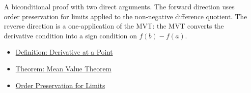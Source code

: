 \begin{remark*}
A biconditional proof with two direct arguments. The forward direction uses order preservation for limits applied to the non-negative difference quotient. The reverse direction is a one-application of the MVT: the MVT converts the derivative condition into a sign condition on $f(b) - f(a)$.
\end{remark*}

\begin{dependencies}
\begin{itemize}
  \item \hyperref[def:derivative-at-a-point]{Definition: Derivative at a Point}
  \item \hyperref[thm:mean-value-theorem]{Theorem: Mean Value Theorem}
  \item \hyperref[thm:order-preservation-limits]{Order Preservation for Limits}
\end{itemize}
\end{dependencies}

\clearpage
